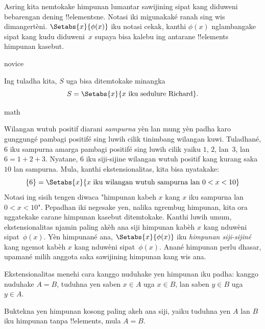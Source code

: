 \documentclass[../../../include/open-logic-section]{subfiles}
\begin{document}
Asring kita nemtokake himpunan lumantar sawijining sipat kang
diduweni bebarengan dening !!{element}sne. Notasi iki migunakaké ranah sing wis dimangertèni. $\Setabs{x}{\phi(x)}$ iku notasi cekak, kanthi $\phi(x)$
nglambangake sipat kang kudu diduweni~$x$ supaya bisa kalebu
ing antarane !!{element}s himpunan kasebut.

\begin{tagblock}{novice}
\begin{ex}
Ing tuladha kita, $S$ uga bisa ditemtokake minangka
\[
S = \Setabs{x}{x \text{ iku sedulure Richard}}.
\]
\end{ex}
\end{tagblock}

\begin{tagblock}{math}
\begin{ex}
Wilangan wutuh positif diarani \emph{sampurna} yèn lan mung yèn padha karo
gunggungé pambagi positifé sing luwih cilik tinimbang wilangan kuwi.
Tuladhané, $6$ iku sampurna amarga pambagi positifé sing luwih cilik
yaiku $1$, $2$, lan~$3$, lan
$6 = 1 + 2 + 3$. Nyatane, $6$ iku siji-sijine wilangan wutuh
positif kang kurang saka $10$ lan sampurna. Mula, kanthi
ekstensionalitas, kita bisa nyatakake:
\[
	\{6\} = \Setabs{x}{x\text{ iku wilangan wutuh sampurna lan }0 < x < 10}
\]
Notasi ing sisih tengen diwaca "himpunan kabeh $x$ kang $x$ iku
sampurna lan $0 < x < 10$". Pepadhan iki negesake yen,
nalika ngrembug himpunan, kita ora nggatekake carane himpunan kasebut
ditemtokake. Kanthi luwih umum, ekstensionalitas njamin paling akèh ana
siji himpunan kabèh $x$ kang nduwèni sipat~$\phi(x)$.
Yèn himpunané ana, $\Setabs{x}{\phi(x)}$ iku \emph{himpunan siji-sijiné} kang
ngemot kabèh $x$ kang nduwèni sipat~$\phi(x)$.
Anané himpunan perlu dhasar, upamané milih anggota saka sawijining
himpunan kang wis ana.
\end{ex}
\end{tagblock}

Ekstensionalitas menehi cara kanggo nuduhake yen himpunan iku padha:
kanggo nuduhake $A = B$, tuduhna yen saben $x \in A$ uga $x \in B$,
lan saben $y \in B$ uga $y \in A$.

\begin{prob}
Buktekna yen himpunan kosong paling akeh ana siji, yaiku tuduhna
yen $A$ lan $B$ iku himpunan tanpa !!{element}s, mula $A = B$.
\end{prob}
\end{document}
